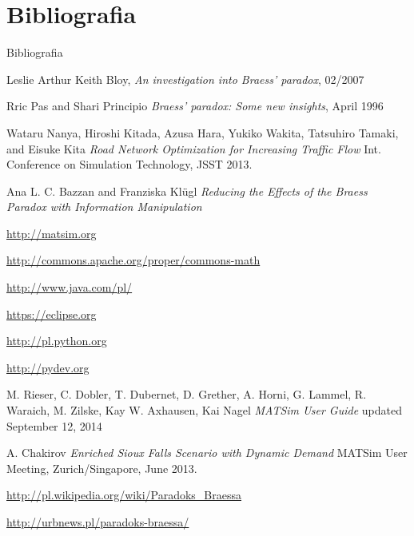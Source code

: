 \documentclass{beamer}
\begin{document}
\section{Bibliografia}
\begin{frame}[allowframebreaks]{Bibliografia}
\begin{thebibliography}{10}

	Leslie Arthur Keith Bloy, 
	\newblock \textit{An investigation into Braess’ paradox}, 02/2007

	Rric Pas and Shari Principio
	\newblock \textit{Braess’ paradox: Some new insights}, April 1996

	Wataru Nanya, Hiroshi Kitada, Azusa Hara, Yukiko Wakita, Tatsuhiro Tamaki, and Eisuke Kita
	\newblock \textit{Road Network Optimization for Increasing Traffic Flow}
	\newblock Int. Conference on Simulation Technology, JSST 2013.

	Ana L. C. Bazzan and Franziska Klügl
	\newblock \textit{Reducing the Effects of the Braess Paradox with Information Manipulation}


\framebreak

	\url{http://matsim.org}	

	\url{http://commons.apache.org/proper/commons-math}

	\url{http://www.java.com/pl/}

	\url{https://eclipse.org}
				
	\url{http://pl.python.org}
	
	\url{http://pydev.org}

\framebreak

	M. Rieser, C. Dobler, T. Dubernet, D. Grether, A. Horni, G. Lammel, R. Waraich, M. Zilske, Kay W. Axhausen, Kai Nagel
	\newblock \textit{MATSim User Guide}
	\newblock updated September 12, 2014

	A. Chakirov
	\newblock \textit{Enriched Sioux Falls Scenario with Dynamic Demand}
	\newblock MATSim User Meeting, Zurich/Singapore, June 2013.
	
	\url{http://pl.wikipedia.org/wiki/Paradoks_Braessa}
	
	\url{http://urbnews.pl/paradoks-braessa/}
		
\end{thebibliography}
\end{frame}
\end{document}

